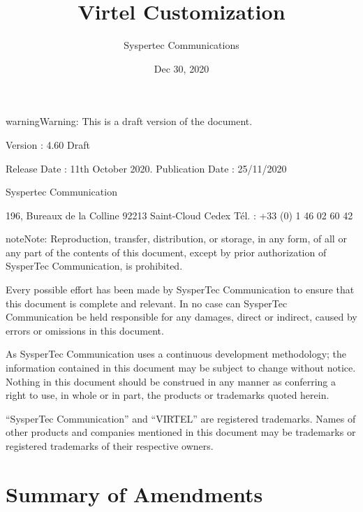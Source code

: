 \documentclass[letterpaper,10pt,english]{sphinxmanual}
\title{Virtel Customization}
\date{Dec 30, 2020}
\author{Syspertec Communications}
\begin{document}
\pagestyle{empty}
\sphinxmaketitle
\pagestyle{plain}
\sphinxtableofcontents
\pagestyle{normal}
\label{\detokenize{Customization::doc}}




\begin{sphinxadmonition}{warning}{Warning:}
This is a draft version of the document.
\end{sphinxadmonition}

Version : 4.60 Draft

Release Date : 11th October 2020. Publication Date : 25/11/2020

Syspertec Communication

196, Bureaux de la Colline 92213 Saint-Cloud Cedex Tél. : +33 (0) 1 46 02 60 42


\begin{sphinxadmonition}{note}{Note:}
Reproduction, transfer, distribution, or storage, in any form, of all or any part of
the contents of this document, except by prior authorization of SysperTec
Communication, is prohibited.

Every possible effort has been made by SysperTec Communication to ensure that this document
is complete and relevant. In no case can SysperTec Communication be held responsible for
any damages, direct or indirect, caused by errors or omissions in this document.

As SysperTec Communication uses a continuous development methodology; the information
contained in this document may be subject to change without notice. Nothing in this
document should be construed in any manner as conferring a right to use, in whole or in
part, the products or trademarks quoted herein.

“SysperTec Communication” and “VIRTEL” are registered trademarks. Names of other products
and companies mentioned in this document may be trademarks or registered trademarks of
their respective owners.
\end{sphinxadmonition}

\newpage


\chapter{Summary of Amendments}
\label{\detokenize{Customization:summary-of-amendments}}\label{\detokenize{Customization:virtel460hw-summary-of-amendments}}
\end{document}
